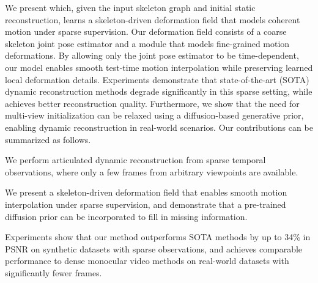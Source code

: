 We present \ourmethod{} which, given the input skeleton graph and initial static reconstruction, learns a skeleton-driven deformation field that models coherent motion under sparse supervision. Our deformation field consists of a coarse skeleton joint pose estimator and a module that models fine-grained motion deformations. By allowing only the joint pose estimator to be time-dependent, our model enables smooth test-time motion interpolation while preserving learned local deformation details.
Experiments demonstrate that state-of-the-art (SOTA) dynamic reconstruction methods degrade significantly in this sparse setting, while \ourmethod{} achieves better reconstruction quality. 
Furthermore, we show that the need for multi-view initialization can be relaxed using a diffusion-based generative prior, enabling dynamic reconstruction in real-world scenarios. 
Our contributions can be summarized as follows. 
\begin{compactitem} 
\item  We perform articulated dynamic reconstruction from sparse temporal observations, where only a few frames from arbitrary viewpoints are available.
\item We present a skeleton-driven deformation field that enables smooth motion interpolation under sparse supervision, and demonstrate that a pre-trained diffusion prior can be incorporated to fill in missing information.
\item Experiments show that our method outperforms SOTA methods by up to 34\% in PSNR on synthetic datasets with sparse observations, and achieves comparable performance to dense monocular video methods on real-world datasets with significantly fewer frames.
\end{compactitem}



